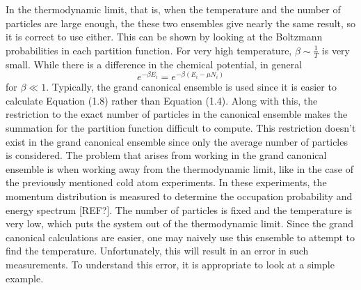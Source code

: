 In the thermodynamic limit, that is, when the temperature and the number of particles are large enough, the these two ensembles give nearly the same result, so it is correct to use either. This can be shown by looking at the Boltzmann probabilities in each partition function. For very high temperature, $\beta \sim \frac{1}{T}$ is very small. While there is a difference in the chemical potential, in general 
\begin{equation}
    e^{-\beta E_i}=e^{-\beta(E_i-\mu N_i)}
\end{equation}
for $\beta\ll 1$. Typically, the grand canonical ensemble is used since it is easier to calculate Equation (1.8) rather than Equation (1.4). Along with this, the restriction to the exact number of particles in the canonical ensemble makes the summation for the partition function difficult to compute. This restriction doesn't exist in the grand canonical ensemble since only the average number of particles is considered. The problem that arises from working in the grand canonical ensemble is when working away from the thermodynamic limit, like in the case of the previously mentioned cold atom experiments. In these experiments, the momentum distribution is measured to determine the occupation probability and energy spectrum \cite{Es2010}[REF?]. The number of particles is fixed and the temperature is very low, which puts the system out of the thermodynamic limit. Since the grand canonical calculations are easier, one may naively use this ensemble to attempt to find the temperature. Unfortunately, this will result in an error in such measurements. To understand this error, it is appropriate to look at a simple example. 

